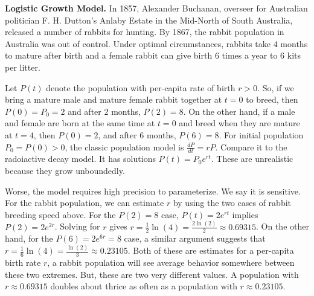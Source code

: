 \begin{example}\label{ex:logistic_growth}
\textbf{Logistic Growth Model.}
In 1857, Alexander Buchanan, overseer for Australian politician F. H. Dutton's Anlaby Estate in the Mid-North of South Australia, released a number of rabbits for hunting.
By 1867, the rabbit population in Australia was out of control.
Under optimal circumstances, rabbits take $4$ months to mature after birth and a female rabbit can give birth $6$ times a year to $6$ kits per litter.

Let $P(t)$ denote the population with per-capita rate of birth $r > 0$.
So, if we bring a mature male and mature female rabbit together at $t=0$ to breed, then $P(0)=P_0=2$ and after $2$ months, $P(2)=8$.
On the other hand, if a male and female are born at the same time at $t=0$ and breed when they are mature at $t=4$, then $P(0)=2$, and after $6$ months, $P(6)=8$.
For initial population $P_0 = P(0) > 0$, the classic population model is $\frac{dP}{dt} = rP$. Compare it to the radoiactive decay model. It has solutions $P(t) = P_0 e^{rt}$. These are unrealistic because they grow unboundedly.

Worse, the model requires high precision to parameterize. We say it is sensitive. For the rabbit population, we can estimate $r$ by using the two cases of rabbit breeding speed above. For the $P(2)=8$ case, $P(t) = 2 e^{rt}$ implies $P(2)=2e^{2r}$. Solving for $r$ gives $r = \frac{1}{2}\ln(4) = \frac{2\ln(2)}{2} \approx 0.69315$. On the other hand, for the $P(6)=2e^{6r}=8$ case, a similar argument suggests that $r = \frac{1}{6}\ln(4) = \frac{\ln(2)}{3} \approx 0.23105$. Both of these are estimates for a per-capita birth rate $r$,  a rabbit population will see average behavior somewhere between these two extremes. But, these are two very different values. A population with $r \approx 0.69315$ doubles about thrice as often as a population with $r \approx 0.23105$.


\end{example}
